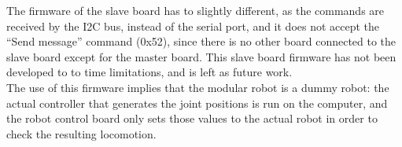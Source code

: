 The firmware of the slave board has to slightly different, as the commands are received by the I2C bus, instead of the serial port, and it does not accept the ``Send message'' command (0x52), since there is no other board connected to the slave board except for the master board. This slave board firmware has not been developed to to time limitations, and is left as future work.\\

The use of this firmware implies that the modular robot is a dummy robot: the actual controller that generates the joint positions is run on the computer, and the robot control board only sets those values to the actual robot in order to check the resulting locomotion.\\
